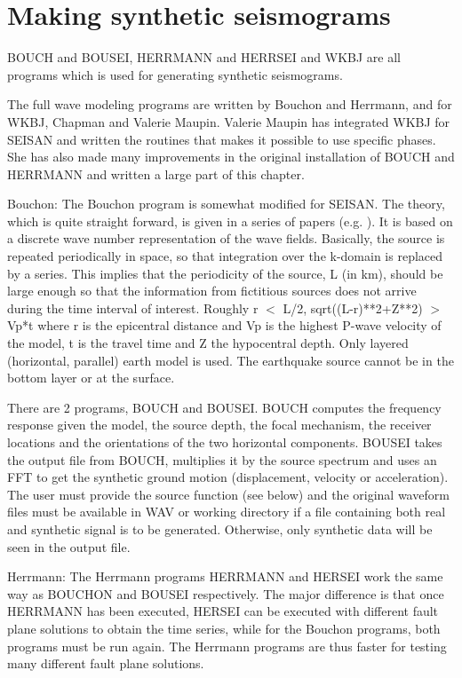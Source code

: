 
\section{Making synthetic seismograms}
\label{sect:synt-seismogram}

BOUCH and BOUSEI, HERRMANN and HERRSEI and WKBJ are all programs which is used for generating synthetic seismograms. 

The full wave modeling programs are written by Bouchon and Herrmann, and for WKBJ, Chapman and Valerie Maupin. Valerie Maupin has integrated WKBJ for SEISAN and written the routines that makes it possible to use specific phases. She has also made many improvements in the original installation of BOUCH and HERRMANN and written a large part of this chapter.   

Bouchon: \newline
The Bouchon program is somewhat modified for SEISAN. The theory, which is quite straight forward, is given in a series of papers (e.g. \citet{bouchon1981}). It is based on a discrete wave number representation of the wave fields. Basically, the source is repeated periodically in space, so that integration over the k-domain is replaced by a series. This implies that the periodicity of the source, L (in km), should be large enough so that the information from fictitious sources does not arrive during the time interval of interest. Roughly r $<$ L/2,  sqrt((L-r)**2+Z**2) $>$ Vp*t where r is the epicentral distance and Vp is the highest P-wave velocity of the model, t is the travel time and Z the hypocentral depth. Only layered (horizontal, parallel) earth model is used. The earthquake source cannot be in the bottom layer or at the surface. 

There are 2 programs, BOUCH and BOUSEI. BOUCH computes the frequency response given the model, the source depth, the focal mechanism, the receiver locations and the orientations of the two horizontal components. BOUSEI takes the output file from BOUCH, multiplies it by the source spectrum and uses an FFT to get the synthetic ground motion (displacement, velocity or acceleration). The user must provide the source function (see below) and the original waveform files must be available in WAV or working directory if a file containing both real and synthetic signal is to be generated. Otherwise, only synthetic data will be seen in the output file. 

Herrmann: \newline
The Herrmann programs HERRMANN and HERSEI work the same way as BOUCHON and BOUSEI respectively. The major difference is that once HERRMANN has been executed, HERSEI can be executed with different fault plane solutions to obtain the time series, while for the Bouchon programs, both programs must be run again. The Herrmann programs are thus faster for testing many different fault plane solutions. 


